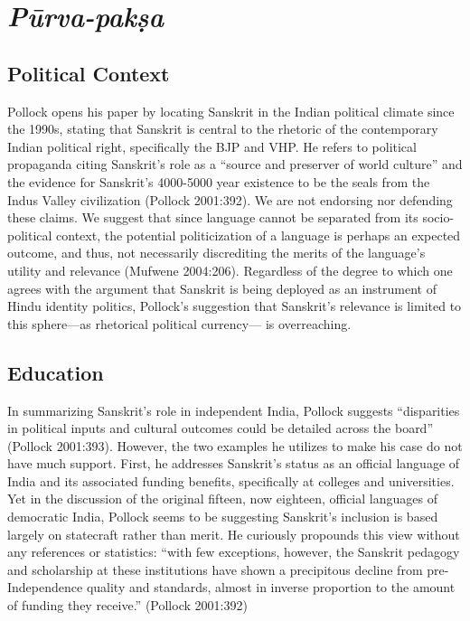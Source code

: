 \section*{{\sl Pūrva-pakṣa}}

\subsection*{Political Context}

Pollock opens his paper by locating Sanskrit in the Indian political climate since the 1990s, stating that Sanskrit is central to the rhetoric of the contemporary Indian political right, specifically the BJP and VHP. He refers to political propaganda citing Sanskrit’s role as a “source and preserver of world culture” and the evidence for Sanskrit’s 4000-5000 year existence to be the seals from the Indus Valley civilization (Pollock 2001:392). We are not endorsing nor defending these claims. We suggest that since language cannot be separated from its socio-political context, the potential politicization of a language is perhaps an expected outcome, and thus, not necessarily discrediting the merits of the language’s utility and relevance (Mufwene 2004:206). Regardless of the degree to which one agrees with the argument that Sanskrit is being deployed as an instrument of Hindu identity politics, Pollock’s suggestion that Sanskrit’s relevance is limited to this sphere—as rhetorical political currency— is overreaching.
\vskip -20pt

\subsection*{Education}
\vskip -4pt

In summarizing Sanskrit’s role in independent India, Pollock suggests “disparities in political inputs and cultural outcomes could be detailed across the board” (Pollock 2001:393). However, the two examples he utilizes to make his case do not have much support. First, he addresses Sanskrit’s status as an official language of India and its associated funding benefits, specifically at colleges and universities. Yet in the discussion of the original fifteen, now eighteen, official languages of democratic India, Pollock seems to be suggesting Sanskrit’s inclusion is based largely on statecraft rather than merit. He curiously propounds this view  without any references or statistics: “with few exceptions, however, the Sanskrit pedagogy and scholarship at these institutions have shown a precipitous decline from pre-Independence quality and standards, almost in inverse proportion to the amount of funding they receive.” (Pollock 2001:392) 

